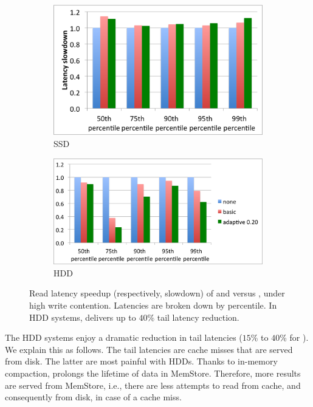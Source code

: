 \begin{figure}[t]
  \centering
  
  \begin{subfigure}[t]{.9\columnwidth}
      \includegraphics[width=\figw]{Figs/latency-ssd.png}
      \caption[]{SSD}
    \label{fig:latency:ssd}
  \end{subfigure}
  \begin{subfigure}[t]{1.1\columnwidth}
      \includegraphics[width=\figw]{Figs/latency-hdd.png}
      \caption[]{HDD}
    \label{fig:latency:hdd}
  \end{subfigure}

  \caption{Read latency speedup (respectively, slowdown) of \basic\/ and \adp\/ versus \none, under high write contention.
  Latencies are broken down by percentile. In HDD systems, \adp\/ delivers up to $40$\% tail latency reduction. 
  }
  
  \label{fig:latency}
\end{figure}

The HDD systems enjoy a dramatic reduction in tail latencies ($15$\% to $40$\% for \adp). 
We explain this as follows. The tail latencies are cache misses that are served from disk. 
The latter are most painful with HDDs. Thanks to in-memory compaction, \adp\/ prolongs 
the lifetime of data in MemStore. Therefore, more results are served from MemStore, i.e., 
there are less attempts to read from cache, and consequently from disk, in case of a cache miss.  

